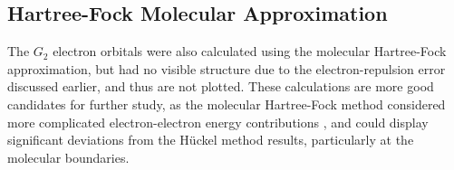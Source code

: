 \subsection{Hartree-Fock Molecular Approximation}\label{subsec:hartreefockmethod}

The $G_2$ electron orbitals were also calculated using the molecular Hartree-Fock approximation, but had no visible structure due to the electron-repulsion error discussed earlier, and thus are not plotted. These calculations are more good candidates for further study, as the molecular Hartree-Fock method considered more complicated electron-electron energy contributions \cite{quiney_art_nodate}, and could display significant deviations from the Hückel method results, particularly at the molecular boundaries.